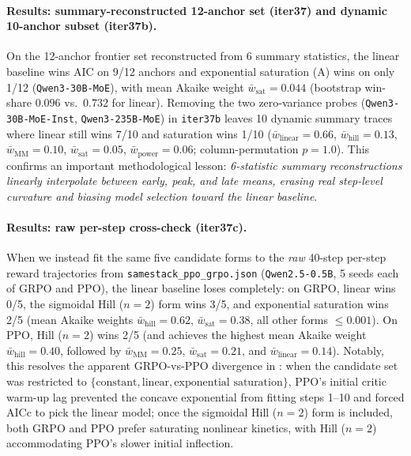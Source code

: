\paragraph{Results: summary-reconstructed 12-anchor set (iter37) and dynamic 10-anchor subset (iter37b).}
On the 12-anchor frontier set reconstructed from 6 summary statistics,
the linear baseline wins AIC on 9/12 anchors and exponential
saturation (A) wins on only 1/12 (\texttt{Qwen3-30B-MoE}), with mean
Akaike weight $\bar{w}_{\mathrm{sat}} = 0.044$ (bootstrap win-share
$0.096$ vs.\ $0.732$ for linear). Removing the two zero-variance probes
(\texttt{Qwen3-30B-MoE-Inst}, \texttt{Qwen3-235B-MoE}) in \texttt{iter37b}
leaves 10 dynamic summary traces where linear still wins 7/10 and
saturation wins 1/10 ($\bar{w}_{\mathrm{linear}}=0.66$,
$\bar{w}_{\mathrm{hill}}=0.13$, $\bar{w}_{\mathrm{MM}}=0.10$,
$\bar{w}_{\mathrm{sat}}=0.05$, $\bar{w}_{\mathrm{power}}=0.06$;
column-permutation $p=1.0$). This confirms an important methodological
lesson: \emph{6-statistic summary reconstructions linearly interpolate
between early, peak, and late means, erasing real step-level curvature
and biasing model selection toward the linear baseline}.

\paragraph{Results: raw per-step cross-check (iter37c).}
When we instead fit the same five candidate forms to the \emph{raw}
40-step per-step reward trajectories from
\texttt{samestack\_ppo\_grpo.json} (\texttt{Qwen2.5-0.5B}, 5 seeds each
of GRPO and PPO), the linear baseline loses completely: on GRPO, linear
wins 0/5, the sigmoidal Hill ($n=2$) form wins 3/5, and exponential
saturation wins 2/5 (mean Akaike weights $\bar{w}_{\mathrm{hill}}=0.62$,
$\bar{w}_{\mathrm{sat}}=0.38$, all other forms $\le 0.001$). On PPO,
Hill ($n=2$) wins 2/5 (and achieves the highest mean Akaike weight
$\bar{w}_{\mathrm{hill}}=0.40$, followed by $\bar{w}_{\mathrm{MM}}=0.25$,
$\bar{w}_{\mathrm{sat}}=0.21$, and $\bar{w}_{\mathrm{linear}}=0.14$).
Notably, this resolves the apparent GRPO-vs-PPO divergence in
: when the candidate set was restricted
to $\{\text{constant}, \text{linear}, \text{exponential saturation}\}$,
PPO's initial critic warm-up lag prevented the concave exponential from
fitting steps 1--10 and forced AICc to pick the linear model; once the
sigmoidal Hill ($n=2$) form is included, both GRPO and PPO prefer
saturating nonlinear kinetics, with Hill ($n=2$) accommodating PPO's
slower initial inflection.

